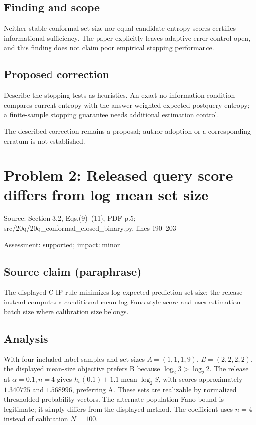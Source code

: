 \documentclass[11pt]{article}
\begin{document}
\subsection*{Finding and scope}

Neither stable conformal-set size nor equal candidate entropy scores certifies informational sufficiency. The paper explicitly leaves adaptive error control open, and this finding does not claim poor empirical stopping performance.

\subsection*{Proposed correction}

Describe the stopping tests as heuristics. An exact no-information condition compares current entropy with the answer-weighted expected postquery entropy; a finite-sample stopping guarantee needs additional estimation control.

The described correction remains a proposal; author adoption or a corresponding erratum is not established.

\section*{Problem 2: Released query score differs from log mean set size}

Source: Section 3.2, Eqs.(9)–(11), PDF p.5; src/20q/20q\_conformal\_closed\_binary.py, lines 190–203

Assessment: supported; impact: minor

\subsection*{Source claim (paraphrase)}

The displayed C-IP rule minimizes log expected prediction-set size; the release instead computes a conditional mean-log Fano-style score and uses estimation batch size where calibration size belongs.

\subsection*{Analysis}

With four included-label samples and set sizes \(A=(1,1,1,9)\), \(B=(2,2,2,2)\), the displayed mean-size objective prefers B because \(\log_2 3>\log_2 2\). The release at \(\alpha=0.1,n=4\) gives \(h_b(0.1)+1.1\operatorname{mean}\log_2 S\), with scores approximately \(1.340725\) and \(1.568996\), preferring A. These sets are realizable by normalized thresholded probability vectors. The alternate population Fano bound is legitimate; it simply differs from the displayed method. The coefficient uses \(n=4\) instead of calibration \(N=100\).
\end{document}
